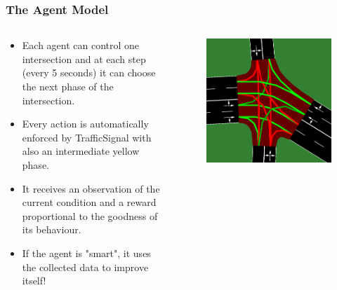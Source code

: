 \documentclass[dvipsnames]{beamer}
\begin{document}
\begin{frame}
\frametitle{The Agent Model}
  \begin{columns}
    \begin{column}{0.6\textwidth}
    {\small
    \begin{itemize}
      \item Each agent can control one intersection and at each step (every 5 seconds) it can choose the next phase of the intersection.
      \item Every action is automatically enforced by TrafficSignal with also an intermediate yellow phase.
      \item It receives an observation of the current condition and a reward proportional to the goodness of its behaviour.
      \item If the agent is "smart", it uses the collected data to improve itself!
    \end{itemize}}
    \end{column}
    \begin{column}{0.4\textwidth}
      \begin{figure}
        \centering
        \includegraphics[width=1.0\textwidth]{figures/sumo-rf-agent.png}
      \end{figure}
    \end{column}
  \end{columns}
\end{frame}
\end{document}

